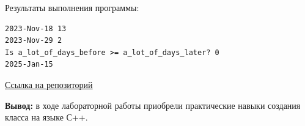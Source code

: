 \documentclass[a4paper,14pt]{extarticle}
\begin{document}
Результаты выполнения программы:
\begin{verbatim}
2023-Nov-18 13
2023-Nov-29 2
Is a_lot_of_days_before >= a_lot_of_days_later? 0
2025-Jan-15
\end{verbatim}
\href{https://github.com/IAmProgrammist/oop/tree/master}{Ссылка на репозиторий}

\textbf{Вывод: } в ходе лабораторной работы приобрели практические навыки создания класса на
языке С++.
\end{document}
